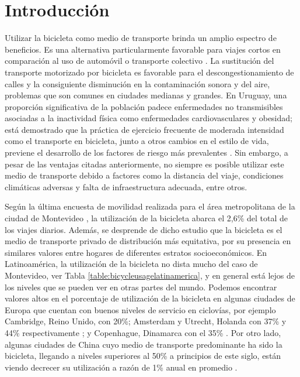\chapter{Introducción}

  Utilizar la bicicleta como medio de transporte brinda un amplio espectro de beneficios. Es una alternativa particularmente favorable para viajes cortos en comparación al uso de automóvil o transporte colectivo \parencite{Hull2014}. La sustitución del transporte motorizado por bicicleta es favorable para el descongestionamiento de calles y la consiguiente disminución en la contaminación sonora y del aire, problemas que son comunes en ciudades medianas y grandes. En Uruguay, una proporción significativa de la población padece enfermedades no transmisibles asociadas a la inactividad física como enfermedades cardiovasculares y obesidad; está demostrado que la práctica de ejercicio frecuente de moderada intensidad como el transporte en bicicleta, junto a otros cambios en el estilo de vida, previene el desarrollo de los factores de riesgo más prevalentes \parencite{heartrisksuy, mspphisicalactivityguid, mspsurveyriskfactors}. Sin embargo, a pesar de las ventajas citadas anteriormente, no siempre es posible utilizar este medio de transporte debido a factores como la distancia del viaje, condiciones climáticas adversas y falta de infraestructura adecuada, entre otros.

  Según la última encuesta de movilidad realizada para el área metropolitana de la ciudad de Montevideo \parencite{Mauttone2017a}, la utilización de la bicicleta abarca el 2,6\% del total de los viajes diarios. Además, se desprende de dicho estudio que la bicicleta es el medio de transporte privado de distribución más equitativa, por su presencia en similares valores entre hogares de diferentes estratos socioeconómicos. En Latinoamérica, la utilización de la bicicleta no dista mucho del caso de Montevideo, ver Tabla \ref{table:bicycleusagelatinamerica}, y en general está lejos de los niveles que se pueden ver en otras partes del mundo. Podemos encontrar valores altos en el porcentaje de utilización de la bicicleta en algunas ciudades de Europa que cuentan con buenos niveles de servicio en ciclovías, por ejemplo Cambridge, Reino Unido, con 20\%; Amsterdam y Utrecht, Holanda con 37\% y 44\% respectivamente \parencite{Hull2014}; y Copenhague, Dinamarca con el 35\% \parencite{Vedel2017}. Por otro lado, algunas ciudades de China cuyo medio de transporte predominante ha sido la bicicleta, llegando a niveles superiores al 50\% a principios de este siglo, están viendo decrecer su utilización a razón de 1\% anual en promedio \parencite{Li2017}.

